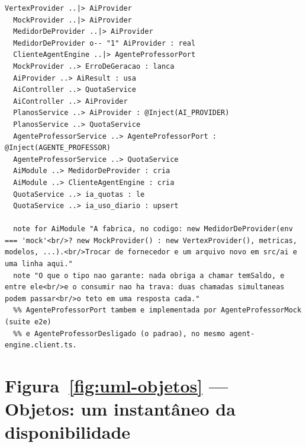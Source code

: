 \begin{lstlisting}[language=mermaid]
  VertexProvider ..|> AiProvider
  MockProvider ..|> AiProvider
  MedidorDeProvider ..|> AiProvider
  MedidorDeProvider o-- "1" AiProvider : real
  ClienteAgentEngine ..|> AgenteProfessorPort
  MockProvider ..> ErroDeGeracao : lanca
  AiProvider ..> AiResult : usa
  AiController ..> QuotaService
  AiController ..> AiProvider
  PlanosService ..> AiProvider : @Inject(AI_PROVIDER)
  PlanosService ..> QuotaService
  AgenteProfessorService ..> AgenteProfessorPort : @Inject(AGENTE_PROFESSOR)
  AgenteProfessorService ..> QuotaService
  AiModule ..> MedidorDeProvider : cria
  AiModule ..> ClienteAgentEngine : cria
  QuotaService ..> ia_quotas : le
  QuotaService ..> ia_uso_diario : upsert

  note for AiModule "A fabrica, no codigo: new MedidorDeProvider(env === 'mock'<br/>? new MockProvider() : new VertexProvider(), metricas, modelos, ...).<br/>Trocar de fornecedor e um arquivo novo em src/ai e uma linha aqui."
  note "O que o tipo nao garante: nada obriga a chamar temSaldo, e entre ele<br/>e o consumir nao ha trava: duas chamadas simultaneas podem passar<br/>o teto em uma resposta cada."
  %% AgenteProfessorPort tambem e implementada por AgenteProfessorMock (suite e2e)
  %% e AgenteProfessorDesligado (o padrao), no mesmo agent-engine.client.ts.
\end{lstlisting}

\section{Figura~\ref{fig:uml-objetos} --- Objetos: um instantâneo da disponibilidade}

